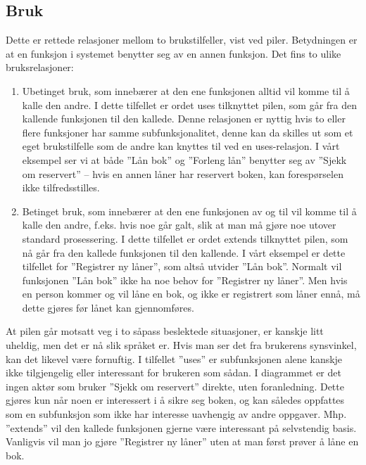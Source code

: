 \subsection{Bruk}

Dette er rettede relasjoner mellom to brukstilfeller, vist ved piler. Betydningen er at en funksjon i systemet benytter seg av en annen funksjon. Det fins to ulike bruksrelasjoner:

\begin{enumerate}

\item
Ubetinget bruk, som innebærer at den ene funksjonen alltid vil komme til å kalle den andre. I dette tilfellet er ordet uses tilknyttet pilen, som går fra den kallende funksjonen til den kallede. Denne relasjonen er nyttig hvis to eller flere funksjoner har samme subfunksjonalitet, denne kan da skilles ut som et eget brukstilfelle som de andre kan knyttes til ved en uses-relasjon. I vårt eksempel ser vi at både ”Lån bok” og ”Forleng lån” benytter seg av ”Sjekk om reservert” – hvis en annen låner har reservert boken, kan forespørselen ikke tilfredsstilles. 

\item
Betinget bruk, som innebærer at den ene funksjonen av og til vil komme til å kalle den andre, f.eks. hvis noe går galt, slik at man må gjøre noe utover standard prosessering. I dette tilfellet er ordet extends tilknyttet pilen, som nå går fra den kallede funksjonen til den kallende. I vårt eksempel er dette tilfellet for ”Registrer ny låner”, som altså utvider ”Lån bok”. Normalt vil funksjonen ”Lån bok” ikke ha noe behov for ”Registrer ny låner”. Men hvis en person kommer og vil låne en bok, og ikke er registrert som låner ennå, må dette gjøres før lånet kan gjennomføres.

\end{enumerate}

At pilen går motsatt veg i to såpass beslektede situasjoner, er kanskje litt uheldig, men det er nå slik språket er. Hvis man ser det fra brukerens synsvinkel, kan det likevel være fornuftig. I tilfellet ”uses” er subfunksjonen alene kanskje ikke tilgjengelig eller interessant for brukeren som sådan. I diagrammet er det ingen aktør som bruker ”Sjekk om reservert” direkte, uten foranledning. Dette gjøres kun når noen er interessert i å sikre seg boken, og kan således oppfattes som en subfunksjon som ikke har interesse uavhengig av andre oppgaver. Mhp. ”extends” vil den kallede funksjonen gjerne være interessant på selvstendig basis. Vanligvis vil man jo gjøre ”Registrer ny låner” uten at man først prøver å låne en bok.

